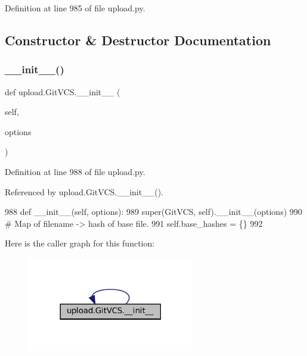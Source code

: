 Definition at line 985 of file upload.\+py.



\subsection{Constructor \& Destructor Documentation}
\mbox{\label{classupload_1_1GitVCS_aba4e1dca1c4b3e5db7ba07f6bce3c839}} 
\subsubsection{\texorpdfstring{\+\_\+\+\_\+init\+\_\+\+\_\+()}{\_\_init\_\_()}\hspace{0.1cm}{\footnotesize\ttfamily [1/2]}}
{\footnotesize\ttfamily def upload.\+Git\+V\+C\+S.\+\_\+\+\_\+init\+\_\+\+\_\+ (\begin{DoxyParamCaption}\item[{}]{self,  }\item[{}]{options }\end{DoxyParamCaption})}



Definition at line 988 of file upload.\+py.



Referenced by upload.\+Git\+V\+C\+S.\+\_\+\+\_\+init\+\_\+\+\_\+().


\begin{DoxyCode}
988   \textcolor{keyword}{def }\_\_init\_\_(self, options):
989     super(GitVCS, self).\_\_init\_\_(options)
990     \textcolor{comment}{# Map of filename -> hash of base file.}
991     self.base\_hashes = \{\}
992 
\end{DoxyCode}
Here is the caller graph for this function\+:
\nopagebreak
\begin{figure}[H]
\begin{center}
\leavevmode
\includegraphics[width=206pt]{classupload_1_1GitVCS_aba4e1dca1c4b3e5db7ba07f6bce3c839_icgraph}
\end{center}
\end{figure}
\mbox{\label{classupload_1_1GitVCS_aba4e1dca1c4b3e5db7ba07f6bce3c839}} 
